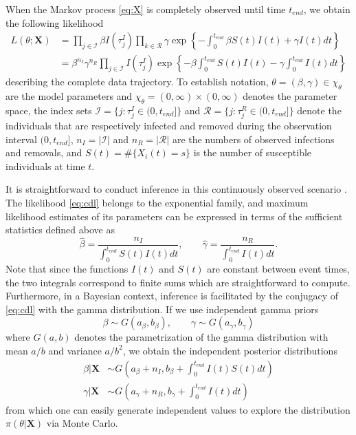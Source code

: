 \documentclass[12pt]{article}
\begin{document}
When the Markov process \eqref{eq:X} is completely observed until time $t_{end}$, we obtain the following likelihood \citep{Streftaris.2002}
\begin{align}
	L(\theta; \mathbf{X})
	& = \prod_{j \in \mathcal{I}} \beta I(\tau^I_j) \prod_{k \in \mathcal{R}} \gamma \exp\left\lbrace - \int_{0}^{t_{end}}\beta S(t)I(t) + \gamma I(t) dt \right\rbrace  \nonumber \\
	\label{eq:cdl}
	& = \beta^{n_I} \gamma^{n_R}\prod_{j \in \mathcal{I}} I(\tau^I_j) \exp\left\lbrace - \beta \int_{0}^{t_{end}} S(t)I(t) - \gamma \int_{0}^{t_{end}} I(t) dt \right\rbrace
\end{align}
describing the complete data trajectory.
To establish notation,
$\theta = (\beta, \gamma) \in \chi_{\theta}$ are the model parameters 
and $\chi_{\theta} = (0, \infty) \times (0, \infty)$ denotes the parameter space, 
the index sets $\mathcal{I} = \{j: \tau^I_j \in (0, t_{end}]\}$ and $\mathcal{R} = \{j: \tau^R_j \in (0, t_{end}]\}$ denote the individuals that are respectively infected and removed during the observation interval $(0, t_{end}]$,
$n_I = |\mathcal{I}|$ and $n_R = |\mathcal{R}|$ are the numbers of observed infections and removals,
and	$S(t) = \#\{X_i(t) = s\}$ is the number of susceptible individuals at time $t$.

It is straightforward to conduct inference in this continuously observed scenario %
. The likelihood \eqref{eq:cdl} belongs to the exponential family, and maximum likelihood estimates of its parameters can be expressed in terms of the sufficient statistics defined above as 
$$
\hat{\beta} = \dfrac{n_I}{ \int_{0}^{t_{end}} S(t)I(t)dt}, \qquad \hat{\gamma} = \dfrac{n_R}{ \int_{0}^{t_{end}} I(t)dt}.
$$
Note that since the functions $I(t)$ and $S(t)$ are constant between event times, the two integrals correspond to finite sums which are straightforward to compute.
Furthermore, in a Bayesian context, inference is facilitated by the conjugacy of \eqref{eq:cdl} with the gamma distribution. If we use independent gamma priors
\begin{equation}
	\label{eq:pri}
	\beta \sim G(a_{\beta}, b_{\beta}), \qquad \gamma \sim G(a_{\gamma}, b_{\gamma})
\end{equation}
where $G(a,b)$ denotes the parametrization of the gamma distribution with mean $a/b$ and variance $a/b^2$, we obtain the independent posterior distributions
\begin{align}
	\label{eq:posterior_theta}
	\beta | \mathbf{X} & \sim G\left( a_{\beta} + n_I , b_{\beta} + \int_{0}^{t_{end}} I(t)S(t) dt\right) \\
	\gamma | \mathbf{X} & \sim G\left( a_{\gamma} + n_R, b_{\gamma} + \int_{0}^{t_{end}} I(t) dt\right)
\end{align}
from which one can easily generate independent values to explore the distribution $\pi(\theta|\mathbf{X})$ via Monte Carlo.
\end{document}
